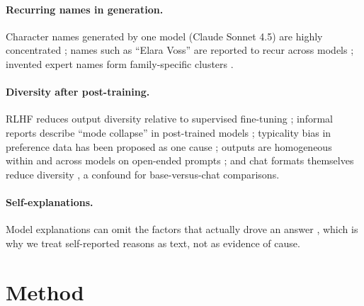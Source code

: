 \documentclass[11pt]{article}
\begin{document}
\paragraph{Recurring names in generation.} Character names generated by one model (Claude Sonnet 4.5) are highly concentrated
\citep{voss2026ainames}; names such as ``Elara Voss'' are reported to recur across models \citep{read_elara}; invented expert names
form family-specific clusters \citep{brzozowski2026ghost}.

\paragraph{Diversity after post-training.} RLHF reduces output diversity relative to supervised fine-tuning
\citep{kirk2023rlhf}; informal reports describe ``mode collapse'' in post-trained models \citep{janus2022modecollapse};
typicality bias in preference data has been proposed as one cause \citep{zhang2025verbalized}; outputs are
homogeneous within and across models on open-ended prompts \citep{jiang2025hivemind}; and chat formats themselves
reduce diversity \citep{priceofformat2025}, a confound for base-versus-chat comparisons.

\paragraph{Self-explanations.} Model explanations can omit the factors that actually drove an answer
\citep{turpin2023unfaithful,anthropic2025reasoning}, which is why we treat self-reported reasons as text, not as
evidence of cause.

\section{Method}
\end{document}
